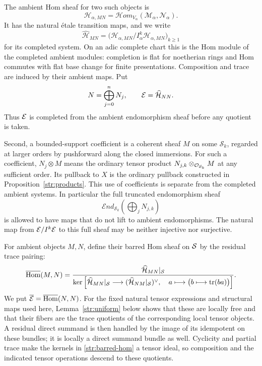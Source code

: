 The ambient Hom sheaf for two such objects is
\[
 \mathcal H_{\alpha,MN}
    =\mathcal Hom_{V_\alpha}(\mathcal M_\alpha,\mathcal N_\alpha).
\]
It has the natural \'etale transition maps, and we write
\[
 \widehat{\mathcal H}_{MN}
   =\bigl(\mathcal H_{\alpha,MN}/I_\alpha^k
                         \mathcal H_{\alpha,MN}\bigr)_{k\geq1}
\]
for its completed system.  On an adic complete chart this is the Hom
module of the completed ambient modules: completion is flat for
noetherian rings and Hom commutes with flat base change for finite
presentations.  Composition and trace are induced by their ambient
maps.  Put
\[
 N=\bigoplus_{j=0}^nN_j,\qquad
 \mathcal E=\widehat{\mathcal H}_{NN}.
\]
Thus $\mathcal E$ is completed from the ambient endomorphism sheaf before
any quotient is taken.

Second, a bounded-support coefficient is a coherent sheaf $M$ on some
$\mathcal S_k$, regarded at larger orders by pushforward along the
closed immersions.  For such a coefficient, $N_j\otimes M$ means the ordinary
tensor product $N_{j,k}\otimes_{\mathcal O_{\mathcal S_k}}M$ at any sufficient
order.  Its pullback to $X$ is the ordinary pullback constructed in
Proposition~\ref{str:products}.  This use of coefficients is separate
from the completed ambient systems.  In particular the full truncated
endomorphism sheaf
\[
 \mathcal{E}nd_{\mathcal S_k}\left(\bigoplus_jN_{j,k}\right)
\]
is allowed to have maps that do not lift to ambient endomorphisms.
The natural map from $\mathcal E/I^k\mathcal E$ to this full sheaf may be neither
injective nor surjective.

For ambient objects $M,N$, define their barred Hom sheaf on $\mathcal S$ by
the residual trace pairing:
\begin{equation}\label{str:barred-hom}
 \overline{\operatorname{Hom}}(M,N)=
 \frac{\widehat{\mathcal H}_{MN}|_{\mathcal S}}
 {\ker\left[
   \widehat{\mathcal H}_{MN}|_{\mathcal S}\longrightarrow
       (\widehat{\mathcal H}_{NM}|_{\mathcal S})^\vee,\quad
   a\longmapsto\bigl(b\longmapsto\operatorname{tr}(ba)\bigr)\right]}.
\end{equation}
We put $\overline{\mathcal E}=\overline{\operatorname{Hom}}(N,N)$.  For the fixed natural
tensor expressions and structural maps used here,
Lemma~\ref{str:uniform} below shows that these are locally free and
that their fibers are the trace quotients of the corresponding local
tensor objects.  A residual direct summand is then handled by the
image of its idempotent on these bundles; it is locally a direct
summand bundle as well.
Cyclicity and partial trace make the kernels in
\eqref{str:barred-hom} a tensor ideal, so composition and the indicated
tensor operations descend to these quotients.

